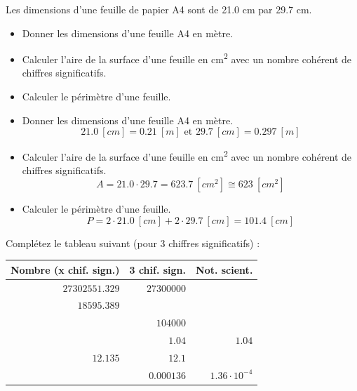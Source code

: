 \documentclass[
  11pt,
  a4paper,
  openany]{book}
\providecommand{\tightlist}{%
  \setlength{\itemsep}{0pt}\setlength{\parskip}{0pt}}
\begin{document}
\newpage

\begin{Exercise}

Les dimensions d'une feuille de papier A4 sont de 21.0 cm par 29.7 cm.

\begin{itemize}
\tightlist
\item
  Donner les dimensions d'une feuille A4 en mètre.
  \vspace{3em}
\item
  Calculer l'aire de la surface d'une feuille en cm\textsuperscript{2} avec un nombre cohérent de chiffres significatifs.
  \vspace{3em}
\item
  Calculer le périmètre d'une feuille.
  \vspace{3em}
\end{itemize}

\end{Exercise}

\begin{Answer}

\begin{itemize}
\tightlist
\item
  Donner les dimensions d'une feuille A4 en mètre.
  \[
  21.0\ [cm] = 0.21\ [m] \text{ et } 29.7\ [cm] = 0.297\ [m]
  \]
\item
  Calculer l'aire de la surface d'une feuille en cm\textsuperscript{2} avec un nombre cohérent de chiffres significatifs.
  \[
  A = 21.0 \cdot 29.7 = 623.7\ [cm^2] ≅ 623\ [cm^2]
  \]
\item
  Calculer le périmètre d'une feuille.
  \[
  P = 2 \cdot 21.0\ [cm] + 2 \cdot 29.7\ [cm] = 101.4\ [cm]
  \]
\end{itemize}

\end{Answer}

\begin{Exercise}
Complétez le tableau suivant (pour 3 chiffres significatifs) :

\end{Exercise}

\begin{longtable}[]{@{}rrr@{}}
\toprule()
Nombre (x chif. sign.) & 3 chif. sign. & Not. scient. \\
\midrule()
\endhead
\(27302551.329\) & \(27300000\) & \\
\(18595.389\) & & \\
& \(104000\) & \\
& \(1.04\) & \(1.04\) \\
\(12.135\) & \(12.1\) & \\
& \(0.000136\) & \(1.36 \cdot 10^{-4}\) \\
\bottomrule()
\end{longtable}
\end{document}
